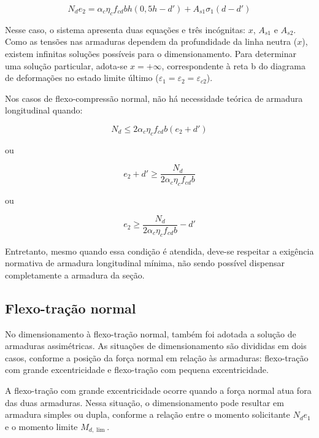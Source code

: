 \begin{equation}
N_d e_2 =
\alpha_c \eta_c f_{cd} b h
\left(0,5h-d'\right)
+A_{s1}\sigma_1(d-d')
\end{equation}

Nesse caso, o sistema apresenta duas equações e três incógnitas: $x$, $A_{s1}$ e $A_{s2}$. Como as tensões nas armaduras dependem da profundidade da linha neutra ($x$), existem infinitas soluções possíveis para o dimensionamento. Para determinar uma solução particular, adota-se $x = +\infty$, correspondente à reta b do diagrama de deformações no estado limite último ($\varepsilon_{1} = \varepsilon_{2} = \varepsilon_{c2}$).

Nos casos de flexo-compressão normal, não há necessidade teórica de armadura longitudinal quando:

\begin{equation}
N_d \leq 2\alpha_c\eta_c f_{cd}b(e_2+d')
\end{equation}

ou

\begin{equation}
e_2+d' \geq \frac{N_d}{2\alpha_c\eta_c f_{cd}b}
\end{equation}

ou

\begin{equation}
e_2 \geq \frac{N_d}{2\alpha_c\eta_c f_{cd}b}-d'
\end{equation}

Entretanto, mesmo quando essa condição é atendida, deve-se respeitar a exigência normativa de armadura longitudinal mínima, não sendo possível dispensar completamente a armadura da seção.

\subsection{Flexo-tração normal}

No dimensionamento à flexo-tração normal, também foi adotada a solução de armaduras assimétricas. As situações de dimensionamento são divididas em dois casos, conforme a posição da força normal em relação às armaduras: flexo-tração com grande excentricidade e flexo-tração com pequena excentricidade.

A flexo-tração com grande excentricidade ocorre quando a força normal atua fora das duas armaduras. Nessa situação, o dimensionamento pode resultar em armadura simples ou dupla, conforme a relação entre o momento solicitante $N_d e_1$ e o momento limite $M_{d,\lim}$.


